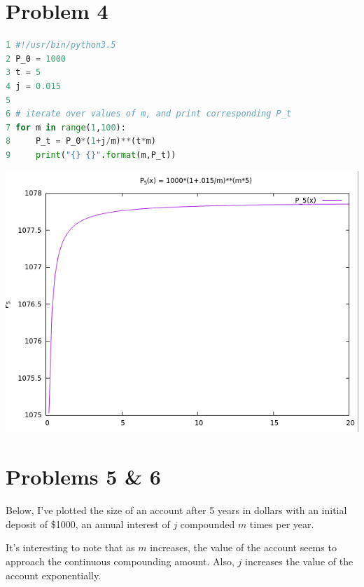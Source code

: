 \documentclass[12pt]{article}
\begin{document}
\section*{Problem 4}


\begin{lstlisting}[language=python, caption=$P_t$ at different values of $m$]
1 #!/usr/bin/python3.5
2 P_0 = 1000
3 t = 5
4 j = 0.015
5 
6 # iterate over values of m, and print corresponding P_t
7 for m in range(1,100):
8     P_t = P_0*(1+j/m)**(t*m)
9     print("{} {}".format(m,P_t))
\end{lstlisting}

\begin{center}
\includegraphics[scale=0.5]{screenshot1.png}
\end{center}

\section*{Problems 5 \& 6}
Below, I've plotted the size of an account after 5 years in dollars with an initial
 deposit of \$1000, an annual interest of $j$ compounded $m$ times per year.
 
 It's interesting to note that as $m$ increases, the value of the account seems to 
 approach the continuous compounding amount. Also, $j$ increases the value of the account
 exponentially.
 
\end{document}
